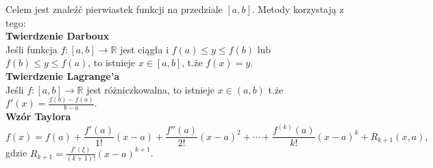 Celem jest znaleźć pierwiastek funkcji na przedziale \( [a, b] \). Metody korzystają z tego: \\
\textbf{Twierdzenie Darboux} \\
Jeśli funkcja \( f: [a, b] \rightarrow \mathbb{R} \) jest ciągła i \( f(a) \leq y \leq f(b) \) lub \( f(b) \leq y \leq f(a) \), to istnieje \( x \in [a, b] \), t.że \( f(x) = y \). \\
\textbf{Twierdzenie Lagrange’a} \\
Jeśli \( f: [a, b] \rightarrow \mathbb{R} \) jest różniczkowalna, to istnieje \( x \in (a, b) \) t.że \( f'(x) = \frac{f(b) - f(a)}{b - a} \). \\
\textbf{Wzór Taylora}
\[
f(x) = f(a) + \frac{f'(a)}{1!}(x - a) + \frac{f''(a)}{2!}(x - a)^2 + \cdots + \frac{f^{(k)}(a)}{k!}(x - a)^k + R_{k+1}(x, a),
\]
gdzie \( R_{k+1} = \frac{f'(\xi)}{(k+1)!}(x - a)^{k+1} \).